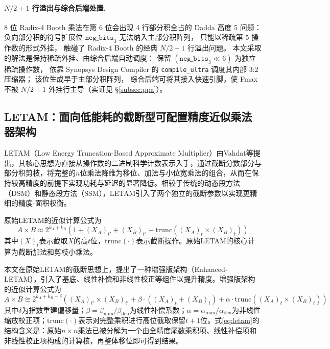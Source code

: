 \documentclass[12pt,a4paper,UTF8]{article}
\begin{document}
\paragraph*{$N/2+1$ 行溢出与综合后端处置.}
8 位 Radix-4 Booth 乘法在第 6 位会出现 4 行部分积全占的 Dadda 高度 5 问题：
负向部分积的符号扩展位 $\mathtt{neg\_bits}_3$ 无法纳入主部分积阵列，
只能以稀疏第 5 操作数的形式外挂，
触碰了 Radix-4 Booth 的经典 $N/2+1$ 行溢出问题\cite{goto1992np1overflow,kuang2010modified}。
本文采取的解法是保持稀疏外挂、由综合后端自动调度：
保留 $(\mathtt{neg\_bits}_3 \!\ll\! 6)$ 为独立稀疏操作数，
依靠 Synopsys Design Compiler 的 \texttt{compile\_ultra} 调度其内部 3:2 压缩器；
该位生成早于主部分积阵列，
综合后端可将其接入快速引脚，使 Fmax 不被 $N/2+1$ 外挂行主导（实证见 §\ref{subsec:ppa}）。

\subsection{LETAM：面向低能耗的截断型可配置精度近似乘法器架构}

LETAM（Low Energy Truncation-Based Approximate Multiplier）由Vahdat等提出\cite{vahdat2017letam}，其核心思想为直接从操作数的二进制科学计数表示入手，通过截断分数部分与部分积剪枝，将完整的$n$位乘法降维为移位、加法与小位宽乘法的组合，从而在保持较高精度的前提下实现功耗与延迟的显著降低。相较于传统的动态段方法（DSM）和静态段方法（SSM），LETAM引入了两个独立的截断参数以实现更精细的精度-面积权衡。

原始LETAM的近似计算公式为
\begin{equation}
A \times B \approx 2^{k_A+k_B} \left( 1 + (X_A)_{t'} + (X_B)_{t'} + \mathrm{trunc}((X_A)_t \times (X_B)_t) \right)
\label{eq:original_letam}
\end{equation}
其中$(X)_t$表示截取$X$的高$t$位，$\mathrm{trunc}(\cdot)$表示截断操作。原始LETAM的核心计算为截断加法和剪枝小乘法。

本文在原始LETAM的截断思想上，提出了一种增强版架构（Enhanced-LETAM），引入了基底、线性补偿和非线性校正等组件以提升精度。增强版架构的近似计算公式为
\begin{equation}
A \times B \cong 2^{k_A+k_B-\delta} \left( (X_A)_{t'} \times (X_B)_{t'} + \beta \cdot ((X_A)_t + (X_B)_t) + \alpha \cdot \mathrm{trunc}((X_A)_t \times (X_B)_t) \right)
\label{eq:letam}
\end{equation}
其中$\delta$为指数重建偏移量；$\beta = \beta_{\mathrm{num}}/\beta_{\mathrm{den}}$为线性补偿系数；$\alpha = \alpha_{\mathrm{num}}/\alpha_{\mathrm{den}}$为非线性缩放校正项；$\mathrm{trunc}(\cdot)$表示对完整乘积进行高位截取保留$t+1$位。式\eqref{eq:letam}的结构含义是：原始$n \times n$乘法已被分解为一个由全精度尾数乘积项、线性补偿项和非线性校正项构成的计算核，再整体移位即可得到结果。
\end{document}
